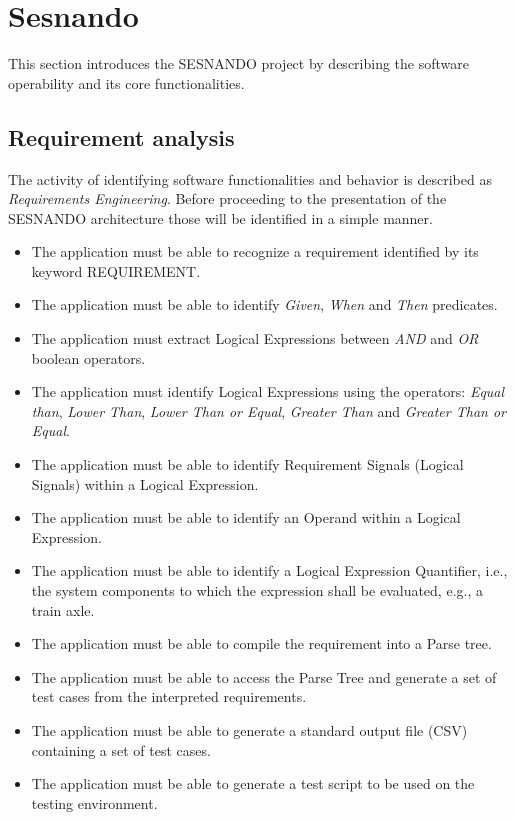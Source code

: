 \chapter{Sesnando}
\label{ch:4}

This section introduces the SESNANDO project by describing the software operability and its core functionalities.

\section{Requirement analysis}
\label{sec:requirement_analysis}

The activity of identifying software functionalities and behavior is described as \textit{Requirements Engineering}. Before proceeding to the presentation of the SESNANDO architecture those will be identified in a simple manner.

\begin{itemize}
\item The application must be able to recognize a requirement identified by its keyword REQUIREMENT.
\item The application must be able to identify \textit{Given}, \textit{When} and \textit{Then} predicates.
\item The application must extract Logical Expressions between \textit{AND} and \textit{OR} boolean operators.
\item The application must identify Logical Expressions using the operators: \textit{Equal than}, \textit{Lower Than}, \textit{Lower Than or Equal}, \textit{Greater Than} and \textit{Greater Than or Equal}.
\item The application must be able to identify Requirement Signals (Logical Signals) within a Logical Expression.
\item The application must be able to identify an Operand within a Logical Expression.
\item The application must be able to identify a Logical Expression Quantifier, i.e., the system components to which the expression shall be evaluated, e.g., a train axle.
\item The application must be able to compile the requirement into a Parse tree.
\item The application must be able to access the Parse Tree and generate a set of test cases from the interpreted requirements.
\item The application must be able to generate a standard output file (CSV) containing a set of test cases.
\item The application must be able to generate a test script to be used on the testing environment.
\end{itemize}



